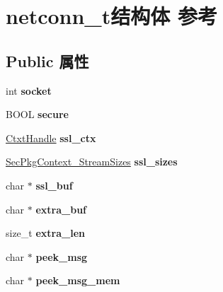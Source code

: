 \hypertarget{structnetconn__t}{}\section{netconn\+\_\+t结构体 参考}
\label{structnetconn__t}
\subsection*{Public 属性}
\begin{DoxyCompactItemize}
\item 
\mbox{\label{structnetconn__t_aba67d3760ed3039f4f40018982f44ab8}} 
int {\bfseries socket}
\item 
\mbox{\label{structnetconn__t_a85775f0ece7c8fdc1a723e692f01e505}} 
B\+O\+OL {\bfseries secure}
\item 
\mbox{\label{structnetconn__t_a90708d05fb63060118c281aa66034967}} 
\hyperlink{struct___sec_handle}{Ctxt\+Handle} {\bfseries ssl\+\_\+ctx}
\item 
\mbox{\label{structnetconn__t_ad4235be9a73dc35cb4d4eb67d38a6bc1}} 
\hyperlink{struct___sec_pkg_context___stream_sizes}{Sec\+Pkg\+Context\+\_\+\+Stream\+Sizes} {\bfseries ssl\+\_\+sizes}
\item 
\mbox{\label{structnetconn__t_ab6075cf1d2a51f9130da5fcd5396f573}} 
char $\ast$ {\bfseries ssl\+\_\+buf}
\item 
\mbox{\label{structnetconn__t_ab630a9cac7266c2bbccf1ab65fc1de73}} 
char $\ast$ {\bfseries extra\+\_\+buf}
\item 
\mbox{\label{structnetconn__t_a2175db6ac4a8206f4d82d2083b22ae84}} 
size\+\_\+t {\bfseries extra\+\_\+len}
\item 
\mbox{\label{structnetconn__t_a67f6dcc245c8249ebd212306c697be83}} 
char $\ast$ {\bfseries peek\+\_\+msg}
\item 
\mbox{\label{structnetconn__t_a6e700e1baed4a3a8554be1175949f7a4}} 
char $\ast$ {\bfseries peek\+\_\+msg\+\_\+mem}
\item 

\end{DoxyCompactItemize}
